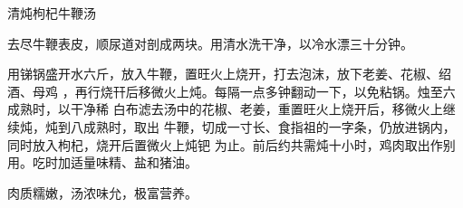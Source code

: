\begin{recipe}{清炖枸杞牛鞭汤}

\ingredients



\cooking

去尽牛鞭表皮，顺尿道对剖成两块。用清水洗干净，以冷水漂三十分钟。

用锑锅盛开水六斤，放入牛鞭，置旺火上烧开，打去泡沫，放下老姜、花椒、绍酒、母鸡
，再行烧幵后移微火上炖。每隔一点多钟翻动一下，以免粘锅。烛至六成熟时，以干净稀
白布滤去汤中的花椒、老姜，重置旺火上烧开后，移微火上继续炖，炖到八成熟时，取出
牛鞭，切成一寸长、食指祖的一字条，仍放进锅内，同时放入枸杞，烧开后置微火上炖钯
为止。前后约共需炖十小时，鸡肉取出作别用。吃时加适量味精、盐和猪油。

\notes

肉质糯嫩，汤浓味允，极富营养。

\end{recipe}

